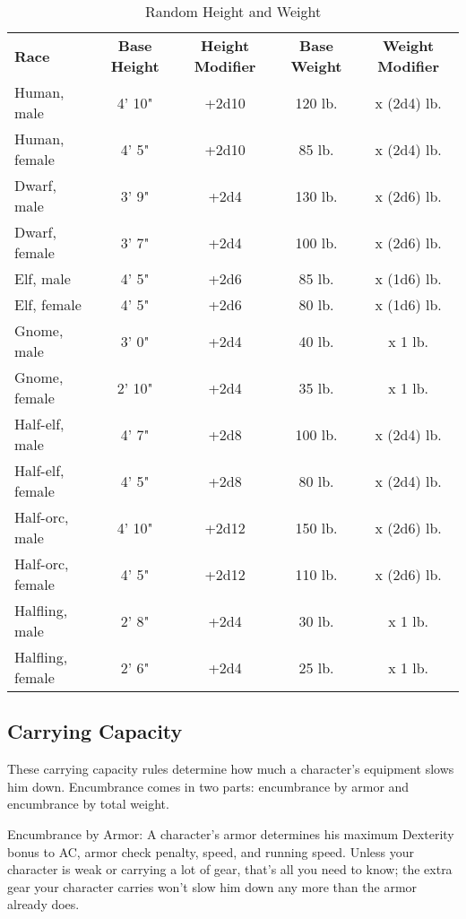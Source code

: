 \begin{table}[htb]
\sffamily
{}
\caption{Random Height and Weight}
\centering
\begin{tabular}{l c c c c}
\textbf{Race} & \textbf{Base Height} & \textbf{Height Modifier} & \textbf{Base Weight} & \textbf{Weight Modifier}\\
Human, male & 4' 10" & +2d10 & 120 lb. & x (2d4) lb.\\
Human, female & 4' 5" & +2d10 & 85 lb. & x (2d4) lb.\\
Dwarf, male & 3' 9" & +2d4 & 130 lb. & x (2d6) lb.\\
Dwarf, female & 3' 7" & +2d4 & 100 lb. & x (2d6) lb.\\
Elf, male & 4' 5" & +2d6 & 85 lb. & x (1d6) lb.\\
Elf, female & 4' 5" & +2d6 & 80 lb. & x (1d6) lb.\\
Gnome, male & 3' 0" & +2d4 & 40 lb. & x 1 lb.\\
Gnome, female & 2' 10" & +2d4 & 35 lb. & x 1 lb.\\
Half-elf, male & 4' 7" & +2d8 & 100 lb. & x (2d4) lb.\\
Half-elf, female & 4' 5" & +2d8 & 80 lb. & x (2d4) lb.\\
Half-orc, male & 4' 10" & +2d12 & 150 lb. & x (2d6) lb.\\
Half-orc, female & 4' 5" & +2d12 & 110 lb. & x (2d6) lb.\\
Halfling, male & 2' 8" & +2d4 & 30 lb. & x 1 lb.\\
Halfling, female & 2' 6" & +2d4 & 25 lb. & x 1 lb.\\
\end{tabular}
\end{table}

\subsection{Carrying Capacity}

				
These carrying capacity rules determine how much a character's equipment slows him down. Encumbrance comes in two parts: encumbrance by armor and encumbrance by total weight.
				
Encumbrance by Armor: A character's armor determines his maximum Dexterity bonus to AC, armor check penalty, speed, and running speed. Unless your character is weak or carrying a lot of gear, that's all you need to know; the extra gear your character carries won't slow him down any more than the armor already does.
				
